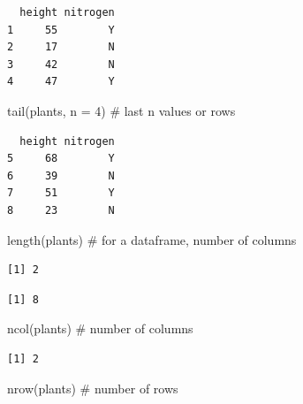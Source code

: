 \documentclass[
  letterpaper,
  DIV=11,
  numbers=noendperiod]{scrartcl}
\newenvironment{Shaded}{\begin{snugshade}}{\end{snugshade}}
\newcommand{\AttributeTok}[1]{\textcolor[rgb]{0.40,0.45,0.13}{#1}}
\newcommand{\CommentTok}[1]{\textcolor[rgb]{0.37,0.37,0.37}{#1}}
\newcommand{\DecValTok}[1]{\textcolor[rgb]{0.68,0.00,0.00}{#1}}
\newcommand{\FunctionTok}[1]{\textcolor[rgb]{0.28,0.35,0.67}{#1}}
\newcommand{\NormalTok}[1]{\textcolor[rgb]{0.00,0.23,0.31}{#1}}
\newcommand{\SpecialCharTok}[1]{\textcolor[rgb]{0.37,0.37,0.37}{#1}}
\begin{document}
\begin{verbatim}
  height nitrogen
1     55        Y
2     17        N
3     42        N
4     47        Y
\end{verbatim}

\begin{Shaded}
\begin{Highlighting}[]
\FunctionTok{tail}\NormalTok{(plants, }\AttributeTok{n =} \DecValTok{4}\NormalTok{) }\CommentTok{\# last n values or rows}
\end{Highlighting}
\end{Shaded}

\begin{verbatim}
  height nitrogen
5     68        Y
6     39        N
7     51        Y
8     23        N
\end{verbatim}

\begin{Shaded}
\begin{Highlighting}[]
\FunctionTok{length}\NormalTok{(plants)  }\CommentTok{\# for a dataframe, number of columns}
\end{Highlighting}
\end{Shaded}

\begin{verbatim}
[1] 2
\end{verbatim}

\begin{Shaded}
\end{Shaded}

\begin{verbatim}
[1] 8
\end{verbatim}

\begin{Shaded}
\begin{Highlighting}[]
\FunctionTok{ncol}\NormalTok{(plants)  }\CommentTok{\# number of columns}
\end{Highlighting}
\end{Shaded}

\begin{verbatim}
[1] 2
\end{verbatim}

\begin{Shaded}
\begin{Highlighting}[]
\FunctionTok{nrow}\NormalTok{(plants)  }\CommentTok{\# number of rows}
\end{Highlighting}
\end{Shaded}
\end{document}
